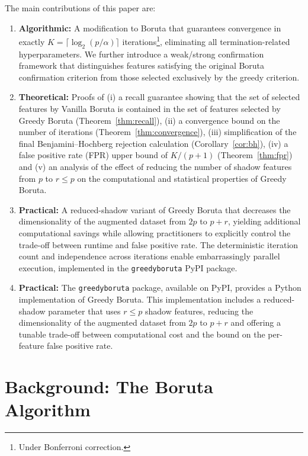 \documentclass[runningheads]{llncs}
\begin{document}
\medskip 
The main contributions of this paper are:
\begin{enumerate}
    \item \textbf{Algorithmic:} A modification to Boruta that guarantees convergence in exactly $K = \lceil \log_2(p/\alpha) \rceil$ iterations\footnote{\label{fn:bonf}Under Bonferroni correction.}, eliminating all termination-related hyperparameters. We further introduce a weak/strong confirmation framework that distinguishes features satisfying the original Boruta confirmation criterion from those selected exclusively by the greedy criterion.
    \item \textbf{Theoretical:} Proofs of (i) a recall guarantee showing that the set of selected features by Vanilla Boruta is contained in the set of features selected by Greedy Boruta (Theorem~\ref{thm:recall}), (ii) a convergence bound on the number of iterations (Theorem~\ref{thm:convergence}), (iii) simplification of the final Benjamini--Hochberg rejection calculation (Corollary~\ref{cor:bh}), (iv) a false positive rate (FPR) upper bound of $K/(p+1)$ (Theorem~\ref{thm:fpr}) and (v) an analysis of the effect of reducing the number of shadow features from \(p\) to \(r \leq p\) on the computational and statistical properties of Greedy Boruta.
    \item \textbf{Practical:} A reduced-shadow variant of Greedy Boruta that decreases the dimensionality of the augmented dataset from \(2p\) to \(p+r\), yielding additional computational savings while allowing practitioners to explicitly control the trade-off between runtime and false positive rate. The deterministic iteration count and independence across iterations enable embarrassingly parallel execution, implemented in the \texttt{greedyboruta} PyPI package.
    \item \textbf{Practical:} The \texttt{greedyboruta} package, available on PyPI, provides a Python implementation of Greedy Boruta. This implementation includes a reduced-shadow  parameter that uses \(r \leq p\) shadow features, reducing the dimensionality of the augmented dataset from \(2p\) to \(p+r\) and offering a tunable trade-off between computational cost and the bound on the per-feature false positive rate. 
\end{enumerate}


\section{Background: The Boruta Algorithm}
\label{sec:background}
\end{document}

